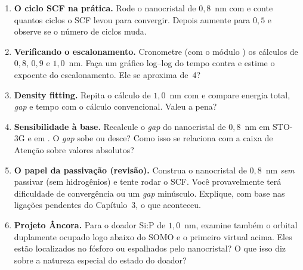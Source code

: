 \begin{enumerate}[leftmargin=*,label=\textbf{4.\arabic*}]
  \item \textbf{O ciclo SCF na prática.} Rode o nanocristal de $0{,}8$~nm com
         e conte quantos ciclos o SCF levou para convergir. Depois
        aumente  para $0{,}5$ e observe se o número de ciclos
        muda.

  \item \textbf{Verificando o escalonamento.} Cronometre (com o módulo )
        os cálculos de $0{,}8$, $0{,}9$ e $1{,}0$~nm. Faça um gráfico
        log--log do tempo contra  e estime o expoente do
        escalonamento. Ele se aproxima de~4?

  \item \textbf{Density fitting.} Repita o cálculo de $1{,}0$~nm com
         e compare energia total, \emph{gap} e
        tempo com o cálculo convencional. Valeu a pena?

  \item \textbf{Sensibilidade à base.} Recalcule o \emph{gap} do nanocristal de
        $0{,}8$~nm em STO-3G e em . O \emph{gap} sobe ou desce? Como
        isso se relaciona com a caixa de Atenção sobre valores absolutos?

  \item \textbf{O papel da passivação (revisão).} Construa o nanocristal de
        $0{,}8$~nm \emph{sem} passivar (sem hidrogênios) e tente rodar o SCF. Você
        provavelmente terá dificuldade de convergência ou um \emph{gap}
        minúsculo. Explique, com base nas ligações pendentes do Capítulo~3, o que
        aconteceu.

  \item \textbf{Projeto Âncora.} Para o doador Si:P de $1{,}0$~nm, examine também o
        orbital duplamente ocupado logo abaixo do SOMO e o primeiro virtual acima.
        Eles estão localizados no fósforo ou espalhados pelo nanocristal? O que
        isso diz sobre a natureza especial do estado do doador?
\end{enumerate}

